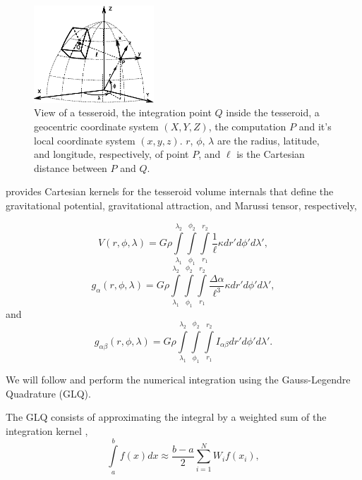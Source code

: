 \documentclass[paper,twocolumn]{geophysics}
\begin{document}
\begin{figure}
    \centering
    \includegraphics[width=0.4\textwidth]{figs/tesseroid}
    \caption{
        View of a tesseroid,
        the integration point $Q$ inside the tesseroid,
        a geocentric coordinate system $(X, Y, Z)$,
        the computation $P$ and it's local coordinate system $(x, y, z)$.
        $r$, $\phi$, $\lambda$ are
        the radius, latitude, and longitude, respectively, of point $P$,
        and $\ell$ is the Cartesian distance between $P$ and $Q$.
    }
    \label{fig:tesseroid}
\end{figure}

\citet{Grombein2013} provides Cartesian kernels for the tesseroid volume
internals that define the gravitational potential, gravitational attraction,
and Marussi tensor, respectively,

\begin{equation}
    V(r,\phi,\lambda) = G \rho
        \int\limits_{\lambda_1}^{\lambda_2}
        \int\limits_{\phi_1}^{\phi_2}
        \int\limits_{r_1}^{r_2}
        \frac{1}{\ell} \kappa  dr' d\phi' d\lambda',
    \label{eq:tesspot}
\end{equation}
\begin{equation}
    g_{\alpha}(r,\phi,\lambda) = G \rho
        \int\limits_{\lambda_1}^{\lambda_2}
        \int\limits_{\phi_1}^{\phi_2}
        \int\limits_{r_1}^{r_2}
        \frac{\Delta\alpha}{\ell^3} \kappa dr' d\phi' d\lambda',
    \label{eq:tessgrav}
\end{equation}
\noindent
and
\begin{equation}
    g_{\alpha\beta}(r,\phi,\lambda) = G \rho
        \int\limits_{\lambda_1}^{\lambda_2}
        \int\limits_{\phi_1}^{\phi_2}
        \int\limits_{r_1}^{r_2}
        I_{\alpha\beta}
        dr' d\phi' d\lambda'.
    \label{eq:tesstensor}
\end{equation}

We will follow \citet{Asgharzadeh2007} and perform the numerical integration
using the Gauss-Legendre Quadrature (GLQ).

The GLQ consists of approximating the integral by a weighted sum of the
integration kernel \citep{Hildebrand1987},
\begin{equation}
    \int\limits_a^b f(x) dx \approx
    \frac{b-a}{2}\sum\limits_{i=1}^N W_i f(x_i),
    \label{eq:glq1d}
\end{equation}
\end{document}
